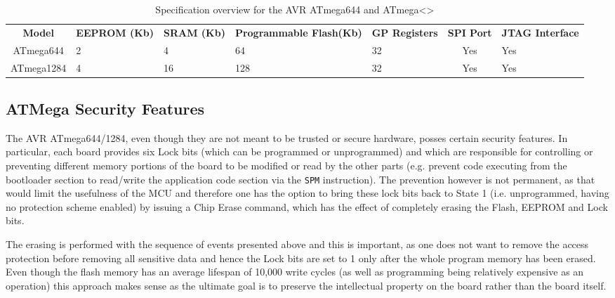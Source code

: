 \documentclass[12pt,a4paper,twocolumn]{article}
\begin{document}
	\begin{table}
		\begin{tabular}{| c | p{2cm} | p{1.5cm} | p{3cm} | p{2.8cm} | c | p{1.9cm} |}
		\textbf{Model} & \textbf{EEPROM (Kb)} & \textbf{SRAM (Kb)} & \textbf{Programmable Flash(Kb)} & \textbf{GP Registers} & \textbf{SPI Port} & \textbf{JTAG Interface}\\
		ATmega644 & 2 & 4 & 64 & 32 & Yes & Yes\\
		ATmega1284 & 4 & 16 & 128 & 32 & Yes & Yes \\
		
		
		\end{tabular}
	\caption{Specification overview for the AVR ATmega644 and ATmega<>}
	\label{table:avr_specs}
	\end{table}
	
	\subsection{ATMega Security Features}
	
	The AVR ATmega644/1284, even though they are not meant to be trusted or secure hardware, posses certain security features. In particular, each board provides six Lock bits (which can be programmed or unprogrammed) and which are responsible for controlling or preventing different memory portions of the board to be modified or read by the other parts (e.g. prevent code executing from the bootloader section to read/write the application code section via the \texttt{SPM} instruction). The prevention however is not permanent, as that would limit the usefulness of the MCU and therefore one has the option to bring these lock bits back to State 1 (i.e. unprogrammed, having no protection scheme enabled) by issuing a Chip Erase command, which has the effect of completely erasing the Flash, EEPROM and Lock bits.
	
	The erasing is performed with the sequence of events presented above and this is important, as one does not want to remove the access protection before removing all sensitive data and hence the Lock bits are set to 1 only after the whole program memory has been erased. Even though the flash memory has an average lifespan of 10,000 write cycles (as well as programming being relatively expensive as an operation) this approach makes sense as the ultimate goal is to preserve the intellectual property on the board rather than the board itself.
	
\end{document}
